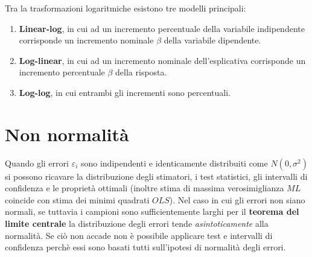 \documentclass[a4page, 11pt]{article} %
\begin{document}
Tra la trasformazioni logaritmiche esistono tre modelli principali: 
\begin{enumerate}[noitemsep]
\item \textbf{Linear-log}, in cui ad un incremento percentuale della variabile indipendente corrisponde un incremento nominale %
 $\beta$ della variabile dipendente.
\item \textbf{Log-linear}, in cui ad un incremento nominale dell’esplicativa corrisponde un incremento percentuale $\beta$ della risposta.
\item \textbf{Log-log}, in cui entrambi gli incrementi sono percentuali.
\end{enumerate}

\section{Non normalità}

Quando gli errori $\varepsilon_i$ sono indipendenti e identicamente distribuiti come $N(0,\sigma^{2})$ si possono ricavare la distribuzione degli stimatori, i test statistici, gli intervalli di confidenza e le proprietà ottimali (inoltre stima di massima verosimiglianza $ML$ coincide con stima dei minimi quadrati $OLS$). 
Nel caso in cui gli errori non siano normali, se tuttavia i campioni sono sufficientemente larghi per il \textbf{teorema del limite centrale} la distribuzione degli errori tende \textit{asintoticamente} alla normalità. Se ciò non accade non è possibile applicare test e intervalli di confidenza perchè essi sono basati tutti sull’ipotesi di normalità degli errori.
\end{document}
